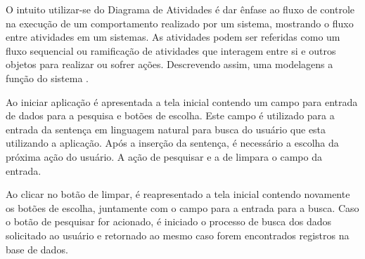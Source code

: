 O intuito utilizar-se do Diagrama de Atividades é dar ênfase ao fluxo de controle na execução de um comportamento realizado por um sistema, mostrando o fluxo entre atividades em um sistemas. As atividades podem ser referidas como um fluxo sequencial ou ramificação de atividades que interagem entre si e outros objetos para realizar ou sofrer ações. Descrevendo assim, uma modelagens a função do sistema \cite{Booch:2012}.  

Ao iniciar aplicação é apresentada a tela inicial contendo um campo para entrada de dados para a pesquisa e botões de escolha. Este campo é utilizado para a entrada da sentença em linguagem natural para busca do usuário que esta utilizando a aplicação. Após a inserção da sentença, é necessário a escolha da próxima ação do usuário. A ação de pesquisar e a de limpara o campo da entrada.

Ao clicar no botão de limpar, é reapresentado a tela inicial contendo novamente os botões de escolha, juntamente com o campo para a entrada para a busca. Caso o botão de pesquisar for acionado, é iniciado o processo de busca dos dados solicitado ao usuário e retornado ao mesmo caso forem encontrados registros na base de dados.
